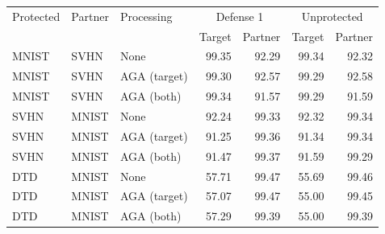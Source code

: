 \begin{tabular}{lllrrrr}
\toprule
Protected & Partner & Processing & \multicolumn{2}{c}{Defense 1} & \multicolumn{2}{c}{Unprotected} \\
 & & & Target & Partner & Target & Partner \\
\midrule
MNIST & SVHN & None & 99.35 & 92.29 & 99.34 & 92.32 \\
MNIST & SVHN & AGA (target) & 99.30 & 92.57 & 99.29 & 92.58 \\
MNIST & SVHN & AGA (both) & 99.34 & 91.57 & 99.29 & 91.59 \\
SVHN & MNIST & None & 92.24 & 99.33 & 92.32 & 99.34 \\
SVHN & MNIST & AGA (target) & 91.25 & 99.36 & 91.34 & 99.34 \\
SVHN & MNIST & AGA (both) & 91.47 & 99.37 & 91.59 & 99.29 \\
DTD & MNIST & None & 57.71 & 99.47 & 55.69 & 99.46 \\
DTD & MNIST & AGA (target) & 57.07 & 99.47 & 55.00 & 99.45 \\
DTD & MNIST & AGA (both) & 57.29 & 99.39 & 55.00 & 99.39 \\
\bottomrule
\end{tabular}
